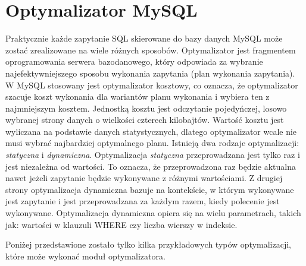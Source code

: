 \section{Optymalizator MySQL}
Praktycznie każde zapytanie SQL skierowane do bazy danych MySQL może zostać zrealizowane na wiele różnych sposobów. Optymalizator jest fragmentem oprogramowania serwera bazodanowego, który odpowiada za wybranie najefektywniejszego sposobu wykonania zapytania (plan wykonania zapytania). W MySQL stosowany jest optymalizator kosztowy, co oznacza, że optymalizator szacuje koszt wykonania dla wariantów planu wykonania i wybiera ten z najmniejszym kosztem. Jednostką kosztu jest odczytanie pojedyńczej, losowo wybranej strony danych o wielkości czterech kilobajtów. Wartość kosztu jest wyliczana na podstawie danych statystycznych, dlatego optymalizator wcale nie musi wybrać najbardziej optymalnego planu. Istnieją dwa rodzaje optymalizacji: \textit{statyczna} i \textit{dynamiczna}. Optymalizacja \textit{statyczna} przeprowadzana jest tylko raz i jest niezależna od wartości. To oznacza, że przeprowadzona raz będzie aktualna nawet jeżeli zapytanie będzie wykonywane z różnymi wartościami. Z drugiej strony optymalizacja dynamiczna bazuje na kontekście, w którym wykonywane jest zapytanie i jest przeprowadzana za każdym razem, kiedy polecenie jest wykonywane. Optymalizacja dynamiczna opiera się na wielu parametrach, takich jak: wartości w klauzuli WHERE czy liczba wierszy w indeksie.

Poniżej przedstawione zostało tylko kilka przykładowych typów optymalizacji, które może wykonać moduł optymalizatora.

